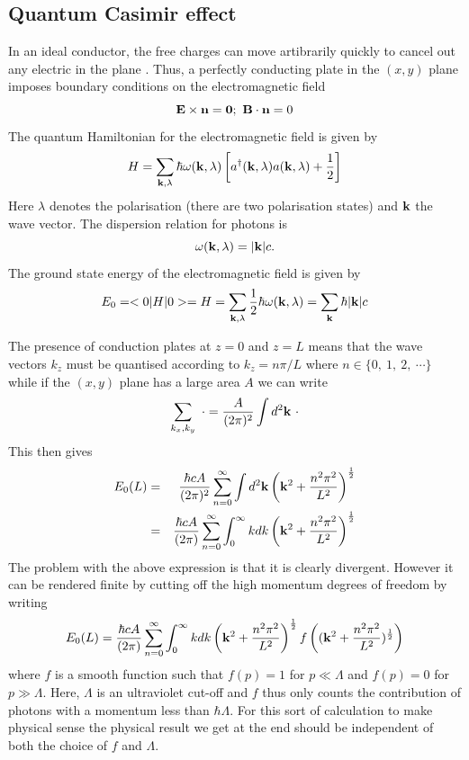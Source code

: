     \subsection{Quantum Casimir effect}
In an ideal conductor, the free charges can move artibrarily quickly to cancel out any electric in the plane \cite{richard_feynman_feynman_1963}. Thus, a perfectly  conducting plate in the $(x,y)$ plane imposes boundary conditions on the electromagnetic field
\begin{equation}
    {\bf E}\times {\bf n} = {\bf 0};\ {\bf B}\cdot {\bf n} = 0
\end{equation}
The quantum Hamiltonian for the electromagnetic field is given by 
\begin{equation}
    H = \sum_{{\bf k},\lambda}\hbar \omega({\bf k},\lambda)\left[a^\dagger({\bf k},\lambda)a({\bf k},\lambda) + {1\over 2}\right]
\end{equation}
Here $\lambda$ denotes the polarisation (there are two polarisation states) and ${\bf k}$ the wave vector. The dispersion 
relation for photons is
\begin{equation}
    \omega({\bf k},\lambda) = |{\bf k}|c.
\end{equation}
The ground state energy of the electromagnetic field \cite{h_b_g_casimir_attraction_1948} is given by
\begin{equation}
    E_0 = < 0|H|0> = H = \sum_{{\bf k},\lambda}{1\over 2}\hbar \omega({\bf k},\lambda)= \sum_{\bf k}\hbar |{\bf k}|c
\end{equation}

The presence of conduction plates at $z=0$ and $z=L$ means that the wave vectors $k_z$
must be quantised according to $k_z= n\pi/L$ where $n \in \{0,\ 1, \ 2, \ \cdots\}$ while
if the $(x,y)$ plane has a large area $A$ we can write
\begin{equation}
    \sum_{k_x,k_y}\ \cdot= {A\over (2\pi)^2}\int  d^2{\bf k} \ \cdot
\end{equation}
This then gives 
\begin{eqnarray}
E_0(L) &=& {\hbar c A\over (2\pi)^2}\sum_{n=0}^\infty  \int  d^2{\bf k} \left({\bf k}^2 + {n^2\pi^2\over L^2}\right)^{1\over 2} \\
&=& {\hbar c A\over (2\pi)}\sum_{n=0}^\infty  \int_0^\infty  kdk \left({\bf k}^2 + {n^2\pi^2\over L^2}\right)^{1\over 2}
\end{eqnarray}
The problem with the above expression is that it is clearly divergent. However it can be rendered finite by cutting off the high momentum degrees of freedom by writing
\begin{equation}
    E_0(L) = {\hbar c A\over (2\pi)}\sum_{n=0}^\infty  \int_0^\infty  kdk \left({\bf k}^2 + {n^2\pi^2\over L^2}\right)^{1\over 2} f\left(({\bf k}^2 + {n^2\pi^2\over L^2})^{1\over 2}\right)
\end{equation}
where $f$ is a smooth function such that $f(p)=1$ for $p\ll\Lambda$ and $f(p)=0$ for $p\gg\Lambda$. Here, $\Lambda$ is an ultraviolet cut-off and $f$ thus only counts the contribution of photons with a momentum less than $\hbar\Lambda$. For this sort of calculation to make physical sense the physical result we get at the end should be independent of both the choice of $f$ and $\Lambda$. 




